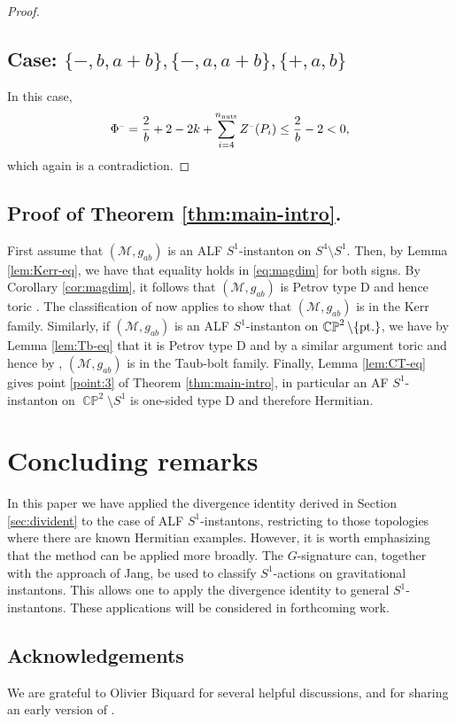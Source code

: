 \documentclass[a4paper,10pt,reqno]{amsart}
\newcommand{\nut}{P}
\newcommand{\cM}{\mathcal{M}}
\theoremstyle{plain}
\DeclareMathOperator{\CP}{\mathbb{C}\mathbb{P}}
\newcommand{\nnuts}{n_{\text{\rm nuts}}}
\newcommand{\M}[1]{{{#1}^{\hspace{-.5pt}\scaleto{-}{4pt}}}}
\numberwithin{equation}{section}
\begin{document}
\begin{proof}
\subsection*{Case: $\{-,b,a+b\},\{-,a,a+b\},\{+,a,b\}$}
In this case, 
\begin{align}
\M{\Phi}
= \frac{2}{b} +2-2k +\sum_{i=4}^{\nnuts}\M{Z}(\nut_i)
\leq \frac{2}{b}-2
<0,
\end{align}
which again is a contradiction.

\end{proof}


\subsection{Proof of Theorem \ref{thm:main-intro}.} 

First assume that $(\cM, g_{ab})$ is an ALF $S^1$-instanton on $S^4 \setminus S^1$. Then, by Lemma \ref{lem:Kerr-eq}, we have that equality holds in \eqref{eq:magdim} for both signs. By Corollary \ref{cor:magdim}, it follows that $(\cM, g_{ab})$ is Petrov type D and hence toric \cite{2013arXiv1302.6975A}. The classification of \cite{Biquard:Gauduchon} now applies to show that $(\cM, g_{ab})$ is in the Kerr family. Similarly, if $(\cM, g_{ab})$ is an ALF $S^1$-instanton on $\CP^2 \setminus \{\text{\rm pt.}\}$, we have by Lemma \ref{lem:Tb-eq} that it is Petrov type D and by a similar argument toric and hence by \cite{Biquard:Gauduchon}, $(\cM, g_{ab})$ is in the Taub-bolt family. Finally, Lemma \ref{lem:CT-eq} gives point \ref{point:3} of Theorem \ref{thm:main-intro}, in particular an AF $S^1$-instanton on $\CP^2\setminus S^1$ is one-sided type D and therefore Hermitian. 


%

\section{Concluding remarks} 
In this paper we have applied the divergence identity derived in Section \ref{sec:divident} to the case of ALF $S^1$-instantons, restricting to those topologies where there are known Hermitian examples. However, it is worth emphasizing that the method can be applied more broadly. The $G$-signature  can, together with the approach of Jang, be used to classify $S^1$-actions on gravitational instantons. This allows one to apply the divergence identity to general $S^1$-instantons. These applications will be considered in forthcoming work. 

\subsection*{Acknowledgements}
We are grateful to Olivier Biquard for several helpful discussions, and for sharing an early version of \cite{Biquard:Gauduchon}. 
\end{document}
